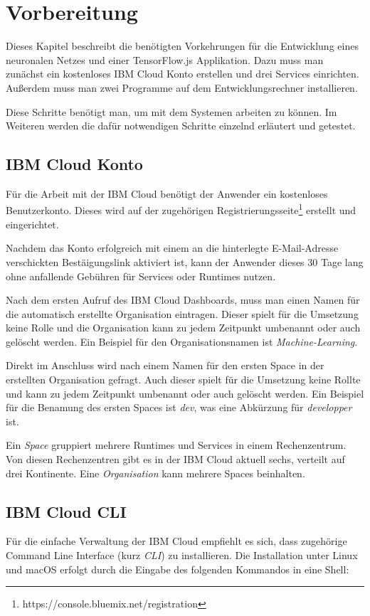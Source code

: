 \section{Vorbereitung}
Dieses Kapitel beschreibt die benötigten Vorkehrungen für die Entwicklung eines neuronalen Netzes und einer
TensorFlow.js Applikation. Dazu muss man zunächst ein kostenloses IBM Cloud Konto erstellen und drei Services
einrichten. Außerdem muss man zwei Programme auf dem Entwicklungsrechner installieren.

Diese Schritte benötigt man, um mit dem Systemen arbeiten zu können. Im Weiteren werden die dafür notwendigen Schritte
einzelnd erläutert und getestet.

\subsection{IBM Cloud Konto}
Für die Arbeit mit der IBM Cloud benötigt der Anwender ein kostenloses Benutzerkonto. Dieses wird auf der zugehörigen
Registrierungsseite\footnote{https://console.bluemix.net/registration} erstellt und eingerichtet.

Nachdem das Konto erfolgreich mit einem an die hinterlegte E-Mail-Adresse verschickten Bestäigungslink aktiviert ist,
kann der Anwender dieses 30 Tage lang ohne anfallende Gebühren für Services oder Runtimes nutzen.

Nach dem ersten Aufruf des IBM Cloud Dashboards, muss man einen Namen für die automatisch erstellte Organisation
eintragen. Dieser spielt für die Umsetzung keine Rolle und die Organisation kann zu jedem Zeitpunkt umbenannt oder auch
gelöscht werden. Ein Beispiel für den Organisationsnamen ist \textit{Machine-Learning}.

Direkt im Anschluss wird nach einem Namen für den ersten Space in der erstellten Organisation gefragt. Auch dieser
spielt für die Umsetzung keine Rollte und kann zu jedem Zeitpunkt umbenannt oder auch gelöscht werden. Ein Beispiel für
die Benamung des ersten Spaces ist \textit{dev}, was eine Abkürzung für \textit{developper} ist.

Ein \textit{Space} gruppiert mehrere Runtimes und Services in einem Rechenzentrum. Von diesen Rechenzentren gibt es in
der IBM Cloud aktuell sechs, verteilt auf drei Kontinente. Eine \textit{Organisation} kann mehrere Spaces beinhalten.

\subsection{IBM Cloud CLI}
Für die einfache Verwaltung der IBM Cloud empfiehlt es sich, dass zugehörige Command Line Interface (kurz \textit{CLI})
zu installieren. Die Installation unter Linux und macOS erfolgt durch die Eingabe des folgenden Kommandos in eine Shell:

